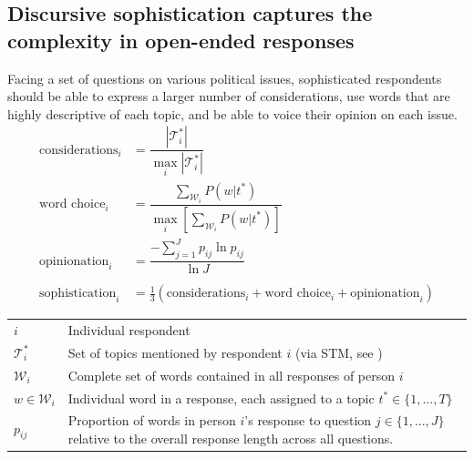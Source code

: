 \documentclass[a0,landscape]{a0poster}
\begin{document}
\begin{multicols}{4}
\section*{Discursive sophistication captures the complexity in open-ended responses}
Facing a set of questions on various political issues, sophisticated respondents should be able to express a larger number of considerations, use words that are highly descriptive of each topic, and be able to voice their opinion on each issue.
\begin{align*}
\text{considerations}_i &= \dfrac{|\mathcal{T}^*_i|}{\max_i|\mathcal{T}^*_i|}\\
\text{word choice}_i &= \dfrac{\sum_{\mathcal{W}_i} P(w|t^*)}{\max_i\left[\sum_{\mathcal{W}_i} P(w|t^*)\right]}\\
\text{opinionation}_i &= \dfrac{-\sum_{j=1}^J p_{ij} \ln p_{ij}}{\ln J}\\\\
\text{sophistication}_i &= \tfrac{1}{3}(\text{considerations}_i + \text{word choice}_i + \text{opinionation}_i)
\end{align*}
\begin{center}\footnotesize
\begin{tabular}{lp{22cm}}
\toprule 
$i$ & Individual respondent \\
$\mathcal{T}^*_i$ & Set of topics mentioned by respondent $i$ (via STM, see \citealt{roberts2014structural}) \\
$\mathcal{W}_i$ & Complete set of words contained in all responses of person $i$\\
$w\in\mathcal{W}_i$ & Individual word in a response, each assigned to a topic $t^* \in \{1,...,T\} $ \\
$p_{ij}$ & Proportion of words in person $i$'s response to question $j\in \{1,...,J\}$ relative to the overall response length across all questions. \\
\bottomrule
\end{tabular}
\end{center}



\end{multicols}
\end{document}
